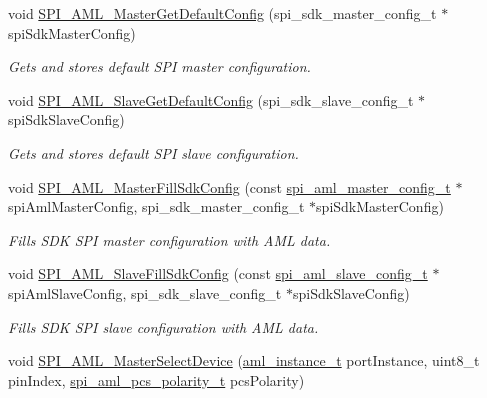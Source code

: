 \begin{DoxyCompactItemize}
void \mbox{\hyperlink{group__function__group_ga81b9d9a7249971568d6fb7e589dcc84d}{S\+P\+I\+\_\+\+A\+M\+L\+\_\+\+Master\+Get\+Default\+Config}} (spi\+\_\+sdk\+\_\+master\+\_\+config\+\_\+t $\ast$spi\+Sdk\+Master\+Config)
\begin{DoxyCompactList}\small\item\em Gets and stores default S\+PI master configuration. \end{DoxyCompactList}\item 
void \mbox{\hyperlink{group__function__group_ga0728c29744ccb400f0b72ce6718f7128}{S\+P\+I\+\_\+\+A\+M\+L\+\_\+\+Slave\+Get\+Default\+Config}} (spi\+\_\+sdk\+\_\+slave\+\_\+config\+\_\+t $\ast$spi\+Sdk\+Slave\+Config)
\begin{DoxyCompactList}\small\item\em Gets and stores default S\+PI slave configuration. \end{DoxyCompactList}\item 
void \mbox{\hyperlink{group__function__group_gaaccd76ab37574aa23c0ab1e1e33ef7c5}{S\+P\+I\+\_\+\+A\+M\+L\+\_\+\+Master\+Fill\+Sdk\+Config}} (const \mbox{\hyperlink{structspi__aml__master__config__t}{spi\+\_\+aml\+\_\+master\+\_\+config\+\_\+t}} $\ast$spi\+Aml\+Master\+Config, spi\+\_\+sdk\+\_\+master\+\_\+config\+\_\+t $\ast$spi\+Sdk\+Master\+Config)
\begin{DoxyCompactList}\small\item\em Fills S\+DK S\+PI master configuration with A\+ML data. \end{DoxyCompactList}\item 
void \mbox{\hyperlink{group__function__group_ga67d9e4bda5bb5facc322d6eab3bc3482}{S\+P\+I\+\_\+\+A\+M\+L\+\_\+\+Slave\+Fill\+Sdk\+Config}} (const \mbox{\hyperlink{structspi__aml__slave__config__t}{spi\+\_\+aml\+\_\+slave\+\_\+config\+\_\+t}} $\ast$spi\+Aml\+Slave\+Config, spi\+\_\+sdk\+\_\+slave\+\_\+config\+\_\+t $\ast$spi\+Sdk\+Slave\+Config)
\begin{DoxyCompactList}\small\item\em Fills S\+DK S\+PI slave configuration with A\+ML data. \end{DoxyCompactList}\item 
void \mbox{\hyperlink{group__function__group_gab85d45f6cddbaaecd78864d25d1824f1}{S\+P\+I\+\_\+\+A\+M\+L\+\_\+\+Master\+Select\+Device}} (\mbox{\hyperlink{common__aml_8h_a562bd37c7d07adcedec5993bc0cd96e5}{aml\+\_\+instance\+\_\+t}} port\+Instance, uint8\+\_\+t pin\+Index, \mbox{\hyperlink{group__enum__group_ga376ab165389ceb9a6e3f763263ff7e06}{spi\+\_\+aml\+\_\+pcs\+\_\+polarity\+\_\+t}} pcs\+Polarity)

\end{DoxyCompactItemize}
